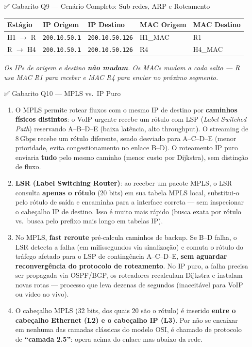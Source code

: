 \documentclass[11pt,a4paper]{article}
\begin{document}
\begin{gabaritocaixa}{✅ Gabarito Q9 --- Cenário Completo: Sub-redes, ARP e Roteamento}
\begin{enumerate}[label=(\alph*)]
\begin{center}
\begin{tabularx}{\textwidth}{lXXXX}
\toprule
\textbf{Estágio} & \textbf{IP Origem} & \textbf{IP Destino} & \textbf{MAC Origem} & \textbf{MAC Destino} \\
\midrule
H1 $\to$ R & \texttt{200.10.50.1} & \texttt{200.10.50.126} & H1\_MAC & R1 \\
R $\to$ H4 & \texttt{200.10.50.1} & \texttt{200.10.50.126} & R4 & H4\_MAC \\
\bottomrule
\end{tabularx}
\end{center}
\textit{Os IPs de origem e destino \textbf{não mudam}. Os MACs mudam a cada salto --- R usa MAC R1 para receber e MAC R4 para enviar no próximo segmento.}
\end{enumerate}
\end{gabaritocaixa}

\begin{gabaritocaixa}{✅ Gabarito Q10 --- MPLS vs.\ IP Puro}
\begin{enumerate}[label=(\alph*)]
    \item O MPLS permite rotear fluxos com o mesmo IP de destino por \textbf{caminhos físicos distintos}: o VoIP urgente recebe um rótulo com LSP (\textit{Label Switched Path}) reservando A--B--D--E (baixa latência, alto throughput). O streaming de 8\,Gbps recebe um rótulo diferente, sendo desviado para A--C--D--E (menor prioridade, evita congestionamento no enlace B--D). O roteamento IP puro enviaria \textbf{tudo} pelo mesmo caminho (menor custo por Dijkstra), sem distinção de fluxo.
    \item \textbf{LSR (Label Switching Router)}: ao receber um pacote MPLS, o LSR consulta \textbf{apenas o rótulo} (20 bits) em sua tabela MPLS local, substitui-o pelo rótulo de saída e encaminha para a interface correta --- sem inspecionar o cabeçalho IP de destino. Isso é muito mais rápido (busca exata por rótulo vs.\ busca pelo prefixo mais longo em tabelas IP).
    \item No MPLS, \textbf{fast reroute} pré-calcula caminhos de backup. Se B--D falha, o LSR detecta a falha (em milissegundos via sinalização) e comuta o rótulo do tráfego afetado para o LSP de contingência A--C--D--E, \textbf{sem aguardar reconvergência do protocolo de roteamento}. No IP puro, a falha precisa ser propagada via OSPF/BGP, os roteadores recalculam Dijkstra e instalam novas rotas --- processo que leva dezenas de segundos (inaceitável para VoIP ou vídeo ao vivo).
    \item O cabeçalho MPLS (32 bits, dos quais 20 são o rótulo) é inserido \textbf{entre o cabeçalho Ethernet (L2) e o cabeçalho IP (L3)}. Por não se encaixar em nenhuma das camadas clássicas do modelo OSI, é chamado de protocolo de \textbf{``camada 2.5''}: opera acima do enlace mas abaixo da rede.
\end{enumerate}
\end{gabaritocaixa}
\end{document}
